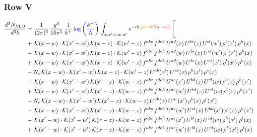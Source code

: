 \documentclass[9pt]{article}
\numberwithin{equation}{section}
\begin{document}
\subsubsection{Row V}
\begin{align}
\frac{d^{3}N_{\mathrm{NLO}}}{d^{3}k} & = \frac{1}{(2\pi)^{3}}\,\frac{g^{4}}{16\pi^{5}}\,\frac{1}{k^{+}}\,{\color{blue}\log{\left(\frac{k^{+}}{\Lambda}\right)}}\,\int_{x,x',z,w,w'}e^{-ik{\color{orange}\cancel{(w'-w)}}{\color{red}(w-w')}}\,\Bigg[\notag\\ &  +\,\mathcal{K}(x-w)\cdot\mathcal{K}(x'-w')\,\mathcal{K}(x-z)\cdot\mathcal{K}(w'-z)\,f^{abc}\,f^{deh}\,U^{ad}(x)\,U^{be}(z)\,U^{cl}(w')\,\rho^{l}(x')\,\rho^{h}(x)\notag\\
& -\,\mathcal{K}(x-w)\cdot\mathcal{K}(x'-w')\,\mathcal{K}(x-z)\cdot\mathcal{K}(w'-z)\,f^{abc}\,f^{deh}\,U^{ad}(w)\,U^{be}(z)\,U^{cl}(w')\,\rho^{l}(x')\,\rho^{h}(x)\notag\\
& +\,\mathcal{K}(x-w)\cdot\mathcal{K}(x'-w')\,\mathcal{K}(x-z)\cdot\mathcal{K}(w'-z)\,f^{abc}\,f^{deh}\,U^{ad}(w)\,U^{be}(x)\,U^{cl}(x')\,\rho^{l}(x')\,\rho^{h}(x)\notag\\
& -N_{c}\,\mathcal{K}(x-w)\cdot\mathcal{K}(x'-w')\,\mathcal{K}(x-z)\cdot\mathcal{K}(w'-z)\,U^{ab}(x')\,U^{ac}(x)\,\rho^{b}(x')\,\rho^{c}(x)\notag\\
& -\,\mathcal{K}(x-w)\cdot\mathcal{K}(x'-w')\,\mathcal{K}(x'-z)\cdot\mathcal{K}(w-z)\,f^{abc}\,f^{deh}\,U^{ae}(x')\,U^{bd}(z)\,U^{cl}(w)\,\rho^{l}(x)\,\rho^{h}(x')\notag\\
& +\,\mathcal{K}(x-w)\cdot\mathcal{K}(x'-w')\,\mathcal{K}(x'-z)\cdot\mathcal{K}(w-z)\,f^{abc}\,f^{deh}\,U^{ae}(w')\,U^{bd}(z)\,U^{cl}(w)\,\rho^{l}(x)\,\rho^{h}(x')\notag\\
& -N_{c}\,\mathcal{K}(x-w)\cdot\mathcal{K}(x'-w')\,\mathcal{K}(x'-z)\cdot\mathcal{K}(w-z)\,U^{ab}(x)\,U^{ac}(x')\,\rho^{b}(x)\,\rho^{c}(x')\notag\\
& -\,\mathcal{K}(x-w)\cdot\mathcal{K}(x'-w')\,\mathcal{K}(x'-z)\cdot\mathcal{K}(w-z)\,f^{abc}\,f^{deh}\,U^{ae}(w')\,U^{cl}(x)\,U^{bd}(x')\,\rho^{l}(x)\,\rho^{h}(x')\notag\\
& -\,\mathcal{K}(x'-w)\cdot\mathcal{K}(x'-w')\,\mathcal{K}(x-z)\cdot\mathcal{K}(w-z)\,f^{abc}\,f^{deh}\,U^{ae}(x')\,U^{bl}(z)\,U^{cd}(w)\,\rho^{h}(x')\,\rho^{l}(x)\notag\\
& +\,\mathcal{K}(x'-w)\cdot\mathcal{K}(x'-w')\,\mathcal{K}(x-z)\cdot\mathcal{K}(w-z)\,f^{abc}\,f^{deh}\,U^{ae}(w')\,U^{bl}(z)\,U^{cd}(w)\,\rho^{h}(x')\,\rho^{l}(x)\notag\\

\end{align}
\end{document}
